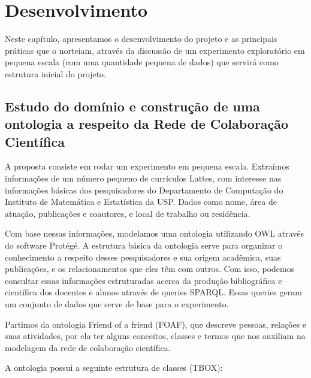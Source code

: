\chapter{Desenvolvimento}
\label{cap:desenvolvimento}

Neste capítulo, apresentamos o desenvolvimento do projeto e as principais práticas que o norteiam, através da discussão de um experimento exploratório em pequena escala (com uma quantidade pequena de dados) que servirá como estrutura inicial do projeto.

\section{Estudo do domínio e construção de uma ontologia a respeito da Rede de Colaboração Científica}
\label{sec:desenvolvimento-ontologia}

A proposta consiste em rodar um experimento em pequena escala. Extraímos informações de um número pequeno de currículos Lattes, com interesse nas informações básicas dos pesquisadores do Departamento de Computação do Instituto de Matemática e Estatística da USP. Dados como nome, área de atuação, publicações e coautores, e local de trabalho ou residência.

Com base nessas informações, modelamos uma ontologia utilizando OWL através do software Protégé. A estrutura básica da ontologia serve para organizar o conhecimento a respeito desses pesquisadores e sua origem acadêmica, suas publicações, e os relacionamentos que eles têm com outros. Com isso, podemos consultar essas informações estruturadas acerca da produção bibliográfica e científica dos docentes e alunos através de queries SPARQL. Essas queries geram um conjunto de dados que serve de base para o experimento.

Partimos da ontologia Friend of a friend (FOAF), que descreve pessoas, relações e suas atividades, por ela ter alguns conceitos, classes e termos que nos auxiliam na modelagem da rede de colaboração científica.

A ontologia possui a seguinte estrutura de classes (TBOX):

